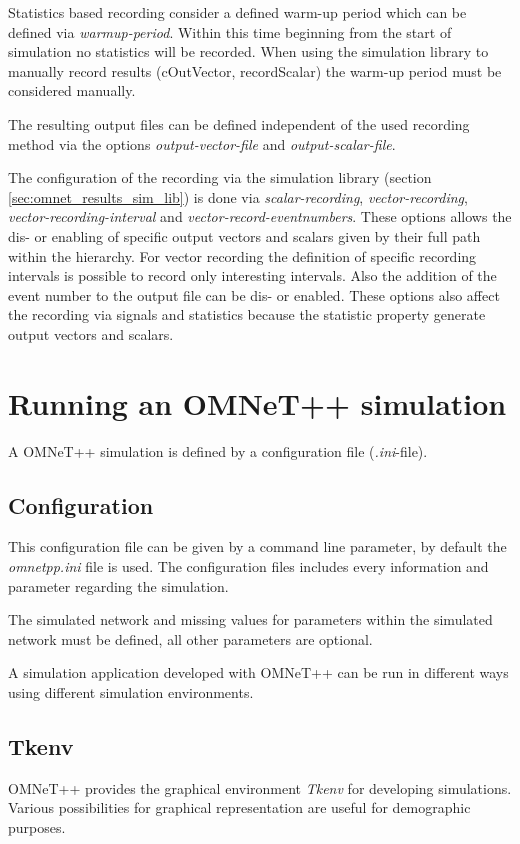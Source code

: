 Statistics based recording consider a defined warm-up period which can be defined via \emph{warmup-period}.
Within this time beginning from the start of simulation no statistics will be recorded.
When using the simulation library to manually record results (cOutVector, recordScalar) the warm-up period must be considered manually. \cite[12.2.2]{omnet_manual}

The resulting output files can be defined independent of the used recording method via the options \emph{output-vector-file} and \emph{output-scalar-file}. \cite[section 12.2.3]{omnet_manual}

The configuration of the recording via the simulation library (section \ref{sec:omnet_results_sim_lib}) is done via \emph{scalar-recording}, \emph{vector-recording}, \emph{vector-recording-interval} and \emph{vector-record-eventnumbers}.
These options allows the dis- or enabling of specific output vectors and scalars given by their full path within the hierarchy.
For vector recording the definition of specific recording intervals is possible to record only interesting intervals.
Also the addition of the event number to the output file can be dis- or enabled.
These options also affect the recording via signals and statistics because the statistic property generate output vectors and scalars.

\section{Running an OMNeT++ simulation}
\label{sec:omnet_running}
A OMNeT++ simulation is defined by a configuration file (\emph{.ini}-file).

\subsection{Configuration}
\label{sec:omnet_running_config}
This configuration file can be given by a command line parameter, by default the \emph{omnetpp.ini} file is used.
The configuration files includes every information and parameter regarding the simulation.

The simulated network and missing values for parameters within the simulated network must be defined, all other parameters are optional.



A simulation application developed with OMNeT++ can be run in different ways using different simulation environments.

\subsection{Tkenv}
\label{sec:omnet_running_tkenv}
OMNeT++ provides the graphical environment \emph{Tkenv} for developing simulations.
Various possibilities for graphical representation are useful for demographic purposes.

